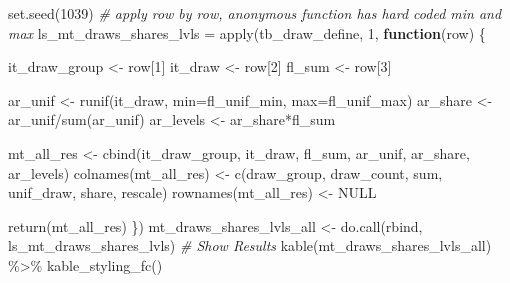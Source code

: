 \documentclass[
]{book}
\newenvironment{Shaded}{\begin{snugshade}}{\end{snugshade}}
\newcommand{\AttributeTok}[1]{\textcolor[rgb]{0.77,0.63,0.00}{#1}}
\newcommand{\CommentTok}[1]{\textcolor[rgb]{0.56,0.35,0.01}{\textit{#1}}}
\newcommand{\ConstantTok}[1]{\textcolor[rgb]{0.00,0.00,0.00}{#1}}
\newcommand{\ControlFlowTok}[1]{\textcolor[rgb]{0.13,0.29,0.53}{\textbf{#1}}}
\newcommand{\DecValTok}[1]{\textcolor[rgb]{0.00,0.00,0.81}{#1}}
\newcommand{\FunctionTok}[1]{\textcolor[rgb]{0.00,0.00,0.00}{#1}}
\newcommand{\NormalTok}[1]{#1}
\newcommand{\OtherTok}[1]{\textcolor[rgb]{0.56,0.35,0.01}{#1}}
\newcommand{\SpecialCharTok}[1]{\textcolor[rgb]{0.00,0.00,0.00}{#1}}
\newcommand{\StringTok}[1]{\textcolor[rgb]{0.31,0.60,0.02}{#1}}
\begin{document}
\begin{Shaded}
\begin{Highlighting}[]
\FunctionTok{set.seed}\NormalTok{(}\DecValTok{1039}\NormalTok{)}
\CommentTok{\# apply row by row, anonymous function has hard coded min and max}
\NormalTok{ls\_mt\_draws\_shares\_lvls }\OtherTok{=}
  \FunctionTok{apply}\NormalTok{(tb\_draw\_define, }\DecValTok{1}\NormalTok{, }\ControlFlowTok{function}\NormalTok{(row) \{}

\NormalTok{    it\_draw\_group }\OtherTok{\textless{}{-}}\NormalTok{ row[}\DecValTok{1}\NormalTok{]}
\NormalTok{    it\_draw }\OtherTok{\textless{}{-}}\NormalTok{ row[}\DecValTok{2}\NormalTok{]}
\NormalTok{    fl\_sum }\OtherTok{\textless{}{-}}\NormalTok{ row[}\DecValTok{3}\NormalTok{]}

\NormalTok{    ar\_unif }\OtherTok{\textless{}{-}} \FunctionTok{runif}\NormalTok{(it\_draw,}
                     \AttributeTok{min=}\NormalTok{fl\_unif\_min,}
                     \AttributeTok{max=}\NormalTok{fl\_unif\_max)}
\NormalTok{    ar\_share }\OtherTok{\textless{}{-}}\NormalTok{ ar\_unif}\SpecialCharTok{/}\FunctionTok{sum}\NormalTok{(ar\_unif)}
\NormalTok{    ar\_levels }\OtherTok{\textless{}{-}}\NormalTok{ ar\_share}\SpecialCharTok{*}\NormalTok{fl\_sum}

\NormalTok{    mt\_all\_res }\OtherTok{\textless{}{-}} \FunctionTok{cbind}\NormalTok{(it\_draw\_group, it\_draw, fl\_sum,}
\NormalTok{                        ar\_unif, ar\_share, ar\_levels)}
    \FunctionTok{colnames}\NormalTok{(mt\_all\_res) }\OtherTok{\textless{}{-}}
      \FunctionTok{c}\NormalTok{(}\StringTok{\textquotesingle{}draw\_group\textquotesingle{}}\NormalTok{, }\StringTok{\textquotesingle{}draw\_count\textquotesingle{}}\NormalTok{, }\StringTok{\textquotesingle{}sum\textquotesingle{}}\NormalTok{,}
        \StringTok{\textquotesingle{}unif\_draw\textquotesingle{}}\NormalTok{, }\StringTok{\textquotesingle{}share\textquotesingle{}}\NormalTok{, }\StringTok{\textquotesingle{}rescale\textquotesingle{}}\NormalTok{)}
    \FunctionTok{rownames}\NormalTok{(mt\_all\_res) }\OtherTok{\textless{}{-}} \ConstantTok{NULL}

    \FunctionTok{return}\NormalTok{(mt\_all\_res)}
\NormalTok{  \})}
\NormalTok{mt\_draws\_shares\_lvls\_all }\OtherTok{\textless{}{-}} \FunctionTok{do.call}\NormalTok{(rbind, ls\_mt\_draws\_shares\_lvls)}
\CommentTok{\# Show Results}
\FunctionTok{kable}\NormalTok{(mt\_draws\_shares\_lvls\_all) }\SpecialCharTok{\%\textgreater{}\%} \FunctionTok{kable\_styling\_fc}\NormalTok{()}
\end{Highlighting}
\end{Shaded}
\end{document}
